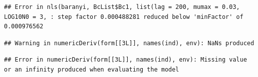 \documentclass[]{book}
\newenvironment{Shaded}{\begin{snugshade}}{\end{snugshade}}
\newcommand{\KeywordTok}[1]{\textcolor[rgb]{0.13,0.29,0.53}{\textbf{#1}}}
\newcommand{\DataTypeTok}[1]{\textcolor[rgb]{0.13,0.29,0.53}{#1}}
\newcommand{\DecValTok}[1]{\textcolor[rgb]{0.00,0.00,0.81}{#1}}
\newcommand{\FloatTok}[1]{\textcolor[rgb]{0.00,0.00,0.81}{#1}}
\newcommand{\StringTok}[1]{\textcolor[rgb]{0.31,0.60,0.02}{#1}}
\newcommand{\OperatorTok}[1]{\textcolor[rgb]{0.81,0.36,0.00}{\textbf{#1}}}
\newcommand{\NormalTok}[1]{#1}
\theoremstyle{definition}
\theoremstyle{definition}
\theoremstyle{definition}
\theoremstyle{remark}
\begin{document}
\begin{Shaded}
\end{Shaded}

\begin{verbatim}
## Error in nls(baranyi, BcList$Bc1, list(lag = 200, mumax = 0.03, LOG10N0 = 3, : step factor 0.000488281 reduced below 'minFactor' of 0.000976562
\end{verbatim}

\begin{Shaded}
\end{Shaded}

\begin{verbatim}
## Warning in numericDeriv(form[[3L]], names(ind), env): NaNs produced
\end{verbatim}

\begin{verbatim}
## Error in numericDeriv(form[[3L]], names(ind), env): Missing value or an infinity produced when evaluating the model
\end{verbatim}

\begin{Shaded}
\end{Shaded}
\end{document}
